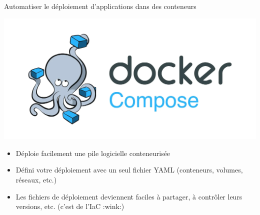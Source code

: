 \documentclass[aspectratio=169,10pt]{beamer}
\begin{document}
\begin{frame}{Automatiser le déploiement d'applications dans des conteneurs}

\begin{center}
\includegraphics[scale=0.15]{images/docker-compose.png}
\end{center}

\begin{itemize}
    \item Déploie facilement une pile logicielle conteneurisée
    \item Défini votre déploiement avec un seul fichier YAML (conteneurs, volumes, réseaux, etc.)
    \item Les fichiers de déploiement deviennent faciles à partager, à contrôler leurs versions, etc. (c'est de l'IaC :wink:)
\end{itemize}

\end{frame}

\end{document}
